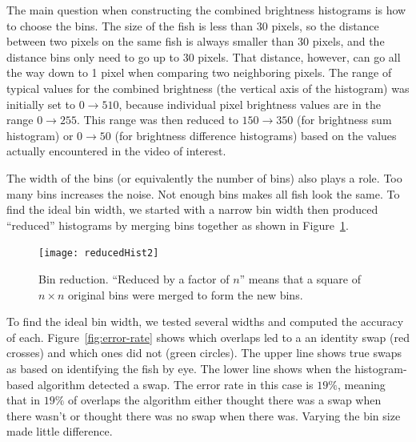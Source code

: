 \documentclass{article}
\begin{document}


The main question when constructing the combined brightness histograms is how to choose the bins. The size of the fish is less than 30 pixels, so the distance between two pixels on the same fish is always smaller than 30 pixels, and the distance bins only need to go up to 30 pixels. That distance, however, can go all the way down to 1 pixel when comparing two neighboring pixels. The range of typical values for the combined brightness (the vertical axis of the histogram) was initially set to $0\rightarrow510$, because individual pixel brightness values are in the range $0\rightarrow255$. This range was then reduced to $150\rightarrow350$ (for brightness sum histogram) or $0\rightarrow50$ (for brightness difference histograms) based on the values actually encountered in the video of interest.

The width of the bins (or equivalently the number of bins) also plays a role. Too many bins increases the noise. Not enough bins makes all fish look the same. To find the ideal bin width, we started with a narrow bin width then produced ``reduced'' histograms by merging bins together as shown in Figure~\ref{fig:reducedHist}.

\begin{figure}[H]
	\centering
	\texttt{[image: reducedHist2]}
	\caption{Bin reduction. ``Reduced by a factor of $n$'' means that a square of $n\times n$ original bins were merged to form the new bins.}
	\label{fig:reducedHist}
\end{figure}



To find the ideal bin width, we tested several widths and computed the accuracy of each. 
Figure~\ref{fig:error-rate} shows which overlaps led to a an identity swap (red crosses) and which ones did not (green circles). The upper line shows true swaps as based on identifying the fish by eye. The lower line shows when the histogram-based algorithm detected a swap. The error rate in this case is $19\%$, meaning that in $19\%$ of overlaps the algorithm either thought there was a swap when there wasn't or thought there was no swap when there was. 
Varying the bin size made little difference.
\end{document}
